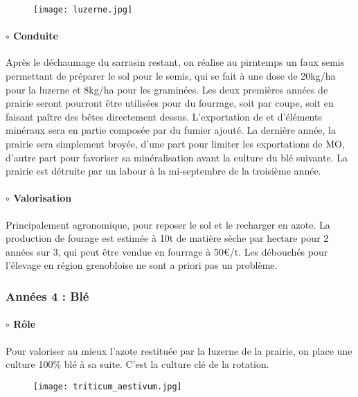 \documentclass{book}
\begin{document}
\begin{figure}[h!]
\begin{center}
	\texttt{[image: luzerne.jpg]}
\end{center}
\end{figure}

\paragraph{$\circ$ Conduite} Après le déchaumage du sarrasin restant, on réalise au pirntemps un faux semis permettant de préparer le sol pour le semis, qui se fait à une dose de 20kg/ha pour la luzerne et 8kg/ha pour les graminées. Les deux premières années de prairie seront pourront être utilisées pour du fourrage, soit par coupe, soit en faisant paître des bêtes directement dessus. L'exportation de et d'éléments minéraux sera en partie composée par du fumier ajouté. La dernière année, la prairie sera simplement broyée, d'une part pour limiter les exportations de MO, d'autre part pour favoriser sa minéralisation avant la culture du blé suivante. La prairie est détruite par un labour à la mi-septembre de la troisième année.

\paragraph{$\circ$ Valorisation} Principalement agronomique, pour reposer le sol et le recharger en azote. La production de fourage est estimée à 10t de matière sèche par hectare pour 2 années sur 3, qui peut être vendue en fourrage à 50\euro{}/t. Les débouchés pour l'élevage en région grenobloise ne sont a priori pas un problème. 

\subsubsection{Années 4 : Blé}

\paragraph{$\circ$ Rôle} Pour valoriser au mieux l'azote restituée par la luzerne de la prairie, on place une culture 100\% blé à sa suite. C'est la culture clé de la rotation.

\begin{figure}[h!]
\begin{center}
	\texttt{[image: triticum\_aestivum.jpg]}
\end{center}
\end{figure}
\end{document}
